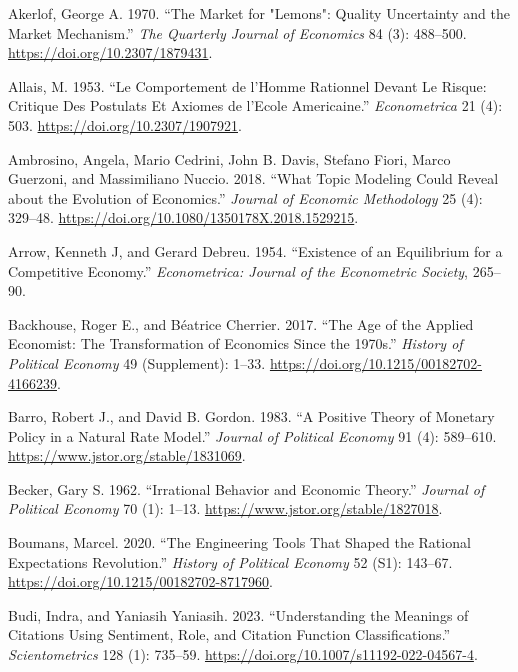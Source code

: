 \documentclass[
]{interact}
\newlength{\cslhangindent}
\newenvironment{CSLReferences}[2] %
 {\begin{list}{}{%
  \setlength{\itemindent}{0pt}
  \setlength{\leftmargin}{0pt}
  \setlength{\parsep}{0pt}
  \ifodd #1
   \setlength{\leftmargin}{\cslhangindent}
   \setlength{\itemindent}{-1\cslhangindent}
  \fi
  \setlength{\itemsep}{#2\baselineskip}}}
 {\end{list}}
\begin{document}
\label{refs}
\begin{CSLReferences}{1}{0}
Akerlof, George A. 1970. {``The {Market} for "{Lemons}": {Quality
Uncertainty} and the {Market Mechanism}.''} \emph{The Quarterly Journal
of Economics} 84 (3): 488--500. \url{https://doi.org/10.2307/1879431}.

Allais, M. 1953. {``Le {Comportement} de l'{Homme Rationnel} Devant Le
{Risque}: {Critique} Des {Postulats} Et {Axiomes} de l'{Ecole
Americaine}.''} \emph{Econometrica} 21 (4): 503.
\url{https://doi.org/10.2307/1907921}.

Ambrosino, Angela, Mario Cedrini, John B. Davis, Stefano Fiori, Marco
Guerzoni, and Massimiliano Nuccio. 2018. {``What Topic Modeling Could
Reveal about the Evolution of Economics.''} \emph{Journal of Economic
Methodology} 25 (4): 329--48.
\url{https://doi.org/10.1080/1350178X.2018.1529215}.

Arrow, Kenneth J, and Gerard Debreu. 1954. {``Existence of an
Equilibrium for a Competitive Economy.''} \emph{Econometrica: Journal of
the Econometric Society}, 265--90.

Backhouse, Roger E., and Béatrice Cherrier. 2017. {``The {Age} of the
{Applied Economist}: {The Transformation} of {Economics} Since the
1970s.''} \emph{History of Political Economy} 49 (Supplement): 1--33.
\url{https://doi.org/10.1215/00182702-4166239}.

Barro, Robert J., and David B. Gordon. 1983. {``A {Positive Theory} of
{Monetary Policy} in a {Natural Rate Model}.''} \emph{Journal of
Political Economy} 91 (4): 589--610.
\url{https://www.jstor.org/stable/1831069}.

Becker, Gary S. 1962. {``Irrational {Behavior} and {Economic Theory}.''}
\emph{Journal of Political Economy} 70 (1): 1--13.
\url{https://www.jstor.org/stable/1827018}.

Boumans, Marcel. 2020. {``The {Engineering Tools That Shaped} the
{Rational Expectations Revolution}.''} \emph{History of Political
Economy} 52 (S1): 143--67.
\url{https://doi.org/10.1215/00182702-8717960}.

Budi, Indra, and Yaniasih Yaniasih. 2023. {``Understanding the Meanings
of Citations Using Sentiment, Role, and Citation Function
Classifications.''} \emph{Scientometrics} 128 (1): 735--59.
\url{https://doi.org/10.1007/s11192-022-04567-4}.


\end{CSLReferences}
\end{document}
